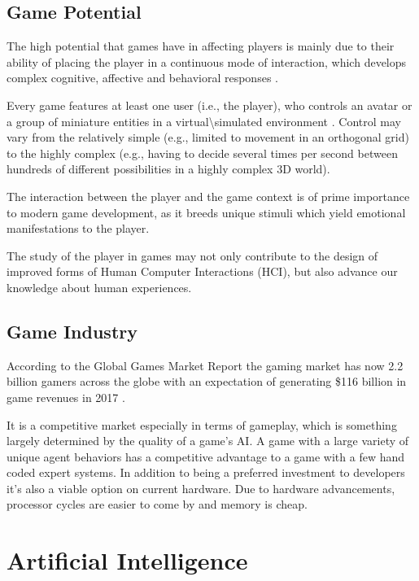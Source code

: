 \subsection{Game Potential}
The high potential that games have in affecting players is mainly due to their ability of placing the player in a continuous mode of interaction, which develops complex cognitive, affective and behavioral responses \citep{YannakakisPlayerModeling2013}.

Every game features at least one user (i.e., the player), who controls an avatar or a group of miniature entities in a virtual\textbackslash{}simulated environment \citep{CallejaIngameimmersionincorporation2011}.
Control may vary from the relatively simple (e.g., limited to movement in an orthogonal grid) to the highly complex (e.g., having to decide several times per second between hundreds of different possibilities in a highly complex 3D world).

The interaction between the player and the game context is of prime importance to modern game development, as it breeds unique stimuli which yield emotional manifestations to the player.

The study of the player in games may not only contribute to the design of improved forms of Human Computer Interactions (HCI), but also advance our knowledge about human experiences.

\subsection{Game Industry}
According to the Global Games Market Report \citep{NewGamingBoom} the gaming market has now 2.2 billion gamers across the globe with an expectation of generating \$116 billion in game revenues in 2017 \citep{GlobalGamesMarket}.

It is a competitive market especially in terms of gameplay, which is something largely determined by the quality of a game’s AI.
A game with a large variety of unique agent behaviors has a competitive advantage to a game with a few hand coded expert systems. In addition to being a preferred investment to developers it’s also a viable option on current hardware. Due to hardware advancements, processor cycles are easier to come by and memory is cheap.

\section{Artificial Intelligence}
